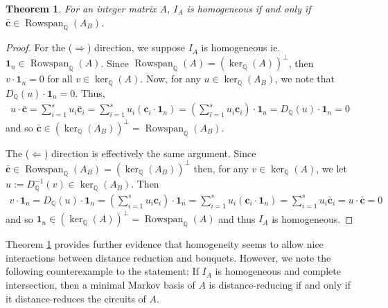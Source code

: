 \documentclass[a4paper, 12pt]{article}
\newcommand{\QQ}{\mathbb Q}
\theoremstyle{plain}
\newtheorem{theorem}{Theorem}[section]
\theoremstyle{definition}
\theoremstyle{remark}
\begin{document}
\begin{theorem} \label{thm:homrow}
    For an integer matrix $A$, $I_A$ is homogeneous if and only if $\mathbf{\bar c} \in \operatorname{Rowspan}_\QQ(A_B)$.
\end{theorem}


\begin{proof}
For the ($\Rightarrow$) direction, we suppose $I_A$ is homogeneous ie. $\mathbf{1}_n \in \operatorname{Rowspan}_\QQ(A)$. Since $\operatorname{Rowspan}_\QQ(A)=(\ker_\QQ(A))^{\perp}$, then $v \cdot \mathbf{1}_n=0$ for all $v \in \ker_\QQ(A)$. Now, for any $u \in \ker_\QQ(A_B)$, we note that $D_{\QQ}(u) \cdot \mathbf{1}_n = 0$. Thus,
\begin{align*}
    u \cdot \mathbf{\bar c}=\sum_{i=1}^s u_i \mathbf{\bar c}_i=\sum_{i=1}^s u_i (\mathbf{c}_i \cdot \mathbf{1}_n)=\left(\sum_{i=1}^s u_i \mathbf{c}_i \right) \cdot \mathbf{1}_n=D_{\QQ}(u) \cdot \mathbf{1}_n=0
\end{align*}
and so $\mathbf{\bar c} \in (\ker_\QQ(A_B))^{\perp}=\operatorname{Rowspan}_\QQ(A_B)$.

The ($\Leftarrow$) direction is effectively the same argument. Since $\mathbf{\bar c} \in \operatorname{Rowspan}_\QQ(A_B)=(\ker_\QQ(A_B))^{\perp}$ then, for any $v \in \ker_\QQ(A)$, we let $u:=D_{\QQ}^{-1}(v) \in \ker_\QQ(A_B)$. Then
\begin{align*}
    v \cdot \mathbf{1}_n=D_{\QQ}(u) \cdot \mathbf{1}_n=\left(\sum_{i=1}^s u_i \mathbf{c}_i \right) \cdot \mathbf{1}_n=\sum_{i=1}^s u_i (\mathbf{c}_i \cdot \mathbf{1}_n)=\sum_{i=1}^s u_i \mathbf{\bar c}_i=u \cdot \mathbf{\bar c}=0
\end{align*}
and so $\mathbf{1}_n \in (\ker_\QQ(A))^{\perp}=\operatorname{Rowspan}_\QQ(A)$ and thus $I_A$ is homogeneous.
\end{proof}



Theorem \ref{thm:homrow} provides further evidence that homogeneity seems to allow nice interactions between distance reduction and bouquets. However, we note the following counterexample to the statement: If $I_A$ is homogeneous and complete intersection, then a minimal Markov basis of $A$ is distance-reducing if and only if it distance-reduces the circuits of $A$. %
\end{document}
